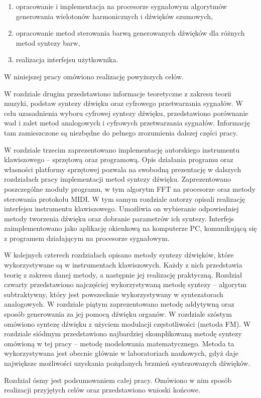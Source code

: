\begin{enumerate}
    \item opracowanie i implementacja na procesorze sygnałowym algorytmów generowania 	wielotonów harmonicznych i dźwięków szumowych,
    
    \item opracowanie metod sterowania barwą generowanych dźwięków dla różnych metod syntezy barw,
    
    \item realizacja interfejsu użytkownika.
\end{enumerate}
W niniejszej pracy omówiono realizację powyższych celów.

W rozdziale drugim przedstawiono informacje teoretyczne z zakresu teorii muzyki, podstaw syntezy dźwięku oraz cyfrowego przetwarzania sygnałów. W celu uzasadnienia wyboru cyfrowej syntezy dźwięku, przedstawiono porównanie wad i zalet metod analogowych i cyfrowych przetwarzania sygnałów. Informację tam zamieszczone są niezbędne do pełnego zrozumienia dalszej części pracy.

W rozdziale trzecim zaprezentowano implementację autorskiego instrumentu klawiszowego – sprzętową oraz programową. Opis działania programu oraz własności platformy sprzętowej pozwala na swobodną prezentację w dalszych rozdziałach pracy implementacji metod syntezy dźwięku. Zaprezentowano poszczególne moduły programu, w tym algorytm FFT na procesorze oraz metody sterowania protokołu MIDI. W tym samym rozdziale autorzy opisali realizację interfejsu instrumentu klawiszowego. Umożliwia on wybieranie odpowiedniej metody tworzenia dźwięku oraz dobranie parametrów ich syntezy. Interfejs zaimplementowano jako aplikację okienkową na komputerze PC, komunikującą się z programem działającym na procesorze sygnałowym.

W kolejnych czterech rozdziałach opisano metody syntezy dźwięków, które wykorzystywane są w instrumentach klawiszowych. Każdy z nich przedstawia teorię z zakresu danej metody, a następnie jej realizację praktyczną. Rozdział czwarty przedstawiono najczęściej wykorzystywaną metodę syntezy – algorytm subtraktywny, który jest powszechnie wykorzystywany w syntezatorach analogowych. W rozdziale piątym zaprezentowano metodę addytywną oraz sposób generowania za jej pomocą dźwięku organów. W rozdziale szóstym omówiono syntezę dźwięku z użyciem modulacji częstotliwości (metoda FM). W rozdziale siódmym przedstawiono najbardziej skomplikowaną metodę syntezy omówioną w tej pracy – metodę modelowania matematycznego. Metoda ta wykorzystywana jest obecnie głównie w laboratoriach naukowych, gdyż daje największe możliwości uzyskania pożądanych brzmień syntezowanych dźwięków.

Rozdział ósmy jest podsumowaniem całej pracy. Omówiono w nim sposób realizacji przyjętych celów oraz przedstawiono wnioski końcowe.